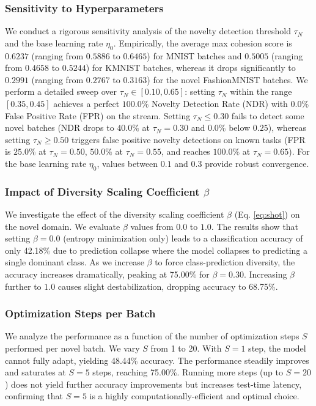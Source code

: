 \documentclass{article}
\theoremstyle{plain}
\theoremstyle{definition}
\theoremstyle{remark}
\begin{document}
\subsubsection{Sensitivity to Hyperparameters}
We conduct a rigorous sensitivity analysis of the novelty detection threshold $\tau_N$ and the base learning rate $\eta_0$. Empirically, the average max cohesion score is $0.6237$ (ranging from $0.5886$ to $0.6465$) for MNIST batches and $0.5005$ (ranging from $0.4658$ to $0.5244$) for KMNIST batches, whereas it drops significantly to $0.2991$ (ranging from $0.2767$ to $0.3163$) for the novel FashionMNIST batches. We perform a detailed sweep over $\tau_N \in [0.10, 0.65]$: setting $\tau_N$ within the range $[0.35, 0.45]$ achieves a perfect $100.0\%$ Novelty Detection Rate (NDR) with $0.0\%$ False Positive Rate (FPR) on the stream. Setting $\tau_N \le 0.30$ fails to detect some novel batches (NDR drops to $40.0\%$ at $\tau_N=0.30$ and $0.0\%$ below $0.25$), whereas setting $\tau_N \ge 0.50$ triggers false positive novelty detections on known tasks (FPR is $25.0\%$ at $\tau_N=0.50$, $50.0\%$ at $\tau_N=0.55$, and reaches $100.0\%$ at $\tau_N=0.65$). For the base learning rate $\eta_0$, values between $0.1$ and $0.3$ provide robust convergence.

\subsubsection{Impact of Diversity Scaling Coefficient $\beta$}
We investigate the effect of the diversity scaling coefficient $\beta$ (Eq. \ref{eq:shot}) on the novel domain. We evaluate $\beta$ values from $0.0$ to $1.0$. The results show that setting $\beta = 0.0$ (entropy minimization only) leads to a classification accuracy of only 42.18\% due to prediction collapse where the model collapses to predicting a single dominant class. As we increase $\beta$ to force class-prediction diversity, the accuracy increases dramatically, peaking at 75.00\% for $\beta = 0.30$. Increasing $\beta$ further to $1.0$ causes slight destabilization, dropping accuracy to 68.75\%.

\subsubsection{Optimization Steps per Batch}
We analyze the performance as a function of the number of optimization steps $S$ performed per novel batch. We vary $S$ from 1 to 20. With $S=1$ step, the model cannot fully adapt, yielding 48.44\% accuracy. The performance steadily improves and saturates at $S=5$ steps, reaching 75.00\%. Running more steps (up to $S=20$) does not yield further accuracy improvements but increases test-time latency, confirming that $S=5$ is a highly computationally-efficient and optimal choice.
\end{document}
